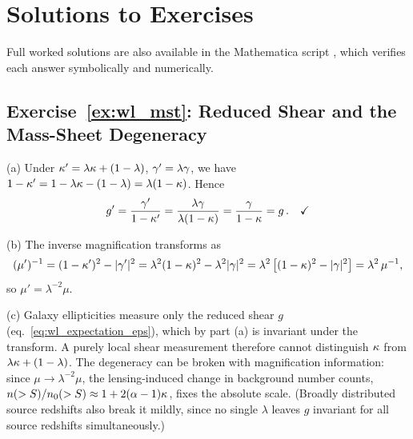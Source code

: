 
\section{Solutions to Exercises}
\label{sec:wl_solutions}

\noindent
Full worked solutions are also available in the Mathematica script
,
which verifies each answer symbolically and numerically.

\subsection*{Exercise~\ref{ex:wl_mst}: Reduced Shear and the Mass-Sheet Degeneracy}

(a) Under $\kappa' = \lambda\kappa + (1-\lambda)$,
$\gamma' = \lambda\gamma$, we have
$1 - \kappa' = 1 - \lambda\kappa - (1-\lambda) = \lambda(1-\kappa)$.
Hence
\begin{equation*}
    g' = \frac{\gamma'}{1 - \kappa'}
    = \frac{\lambda\gamma}{\lambda(1-\kappa)}
    = \frac{\gamma}{1-\kappa} = g\,. \quad \checkmark
\end{equation*}

(b) The inverse magnification transforms as
\begin{equation*}
    (\mu')^{-1} = (1-\kappa')^2 - |\gamma'|^2
    = \lambda^2(1-\kappa)^2 - \lambda^2|\gamma|^2
    = \lambda^2\left[(1-\kappa)^2 - |\gamma|^2\right]
    = \lambda^2\,\mu^{-1},
\end{equation*}
so $\mu' = \lambda^{-2}\mu$. \checkmark

(c) Galaxy ellipticities measure only the reduced shear $g$
(eq.~\ref{eq:wl_expectation_eps}), which by part (a) is invariant under the
transform.  A purely local shear measurement therefore cannot distinguish
$\kappa$ from $\lambda\kappa + (1-\lambda)$.  The degeneracy can be
broken with magnification information: since
$\mu \to \lambda^{-2}\mu$, the lensing-induced change in background number
counts, $n(>S)/n_0(>S) \approx 1 + 2(\alpha-1)\kappa$, fixes the absolute
scale.  (Broadly distributed source redshifts also break it mildly, since
no single $\lambda$ leaves $g$ invariant for all source redshifts
simultaneously.)

